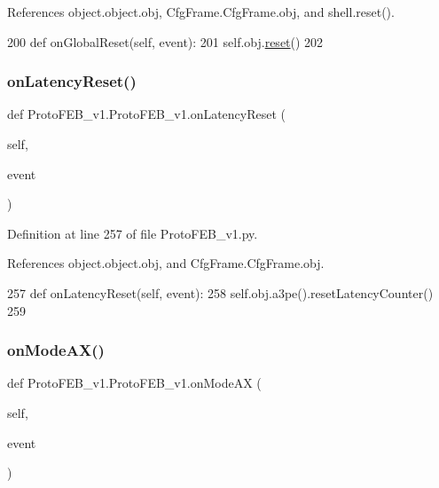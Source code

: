 References object.\+object.\+obj, Cfg\+Frame.\+Cfg\+Frame.\+obj, and shell.\+reset().


\begin{DoxyCode}
200     \textcolor{keyword}{def }onGlobalReset(self, event):
201         self.obj.\hyperlink{namespaceshell_a2f31bbe4baf894f4863c4d392239ab8b}{reset}()
202 
\end{DoxyCode}
\mbox{\label{classProtoFEB__v1_1_1ProtoFEB__v1_a243c7ced24005de9ce61efac1db46564}} 
\subsubsection{\texorpdfstring{on\+Latency\+Reset()}{onLatencyReset()}}
{\footnotesize\ttfamily def Proto\+F\+E\+B\+\_\+v1.\+Proto\+F\+E\+B\+\_\+v1.\+on\+Latency\+Reset (\begin{DoxyParamCaption}\item[{}]{self,  }\item[{}]{event }\end{DoxyParamCaption})}



Definition at line 257 of file Proto\+F\+E\+B\+\_\+v1.\+py.



References object.\+object.\+obj, and Cfg\+Frame.\+Cfg\+Frame.\+obj.


\begin{DoxyCode}
257     \textcolor{keyword}{def }onLatencyReset(self, event):
258         self.obj.a3pe().resetLatencyCounter()
259 
\end{DoxyCode}
\mbox{\label{classProtoFEB__v1_1_1ProtoFEB__v1_ab6385041b979fc82b051649c486a0d13}} 
\subsubsection{\texorpdfstring{on\+Mode\+A\+X()}{onModeAX()}}
{\footnotesize\ttfamily def Proto\+F\+E\+B\+\_\+v1.\+Proto\+F\+E\+B\+\_\+v1.\+on\+Mode\+AX (\begin{DoxyParamCaption}\item[{}]{self,  }\item[{}]{event }\end{DoxyParamCaption})}



